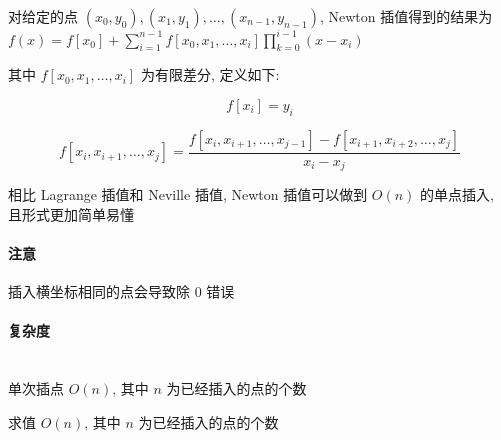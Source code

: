 对给定的点 \((x_0,y_0),(x_1,y_1),\dots,(x_{n-1},y_{n-1})\), Newton 插值得到的结果为 \(\displaystyle f(x)=f[x_0]+\sum_{i=1}^{n-1}f[x_0,x_1,\dots,x_i]\prod_{k=0}^{i-1}(x-x_i)\)

其中 \(f[x_0,x_1,\dots,x_i]\) 为有限差分, 定义如下:

\[
    f[x_i]=y_i
\]

\[
    f[x_i,x_{i+1},\dots,x_j]=\dfrac{f[x_i,x_{i+1},\dots,x_{j-1}]-f[x_{i+1},x_{i+2},\dots,x_j]}{x_i-x_j}
\]

相比 Lagrange 插值和 Neville 插值, Newton 插值可以做到 \(O(n)\) 的单点插入, 且形式更加简单易懂

\paragraph{注意}

插入横坐标相同的点会导致除 \(0\) 错误

\paragraph{复杂度}~\\

单次插点 \(O(n)\), 其中 \(n\) 为已经插入的点的个数

求值 \(O(n)\), 其中 \(n\) 为已经插入的点的个数
